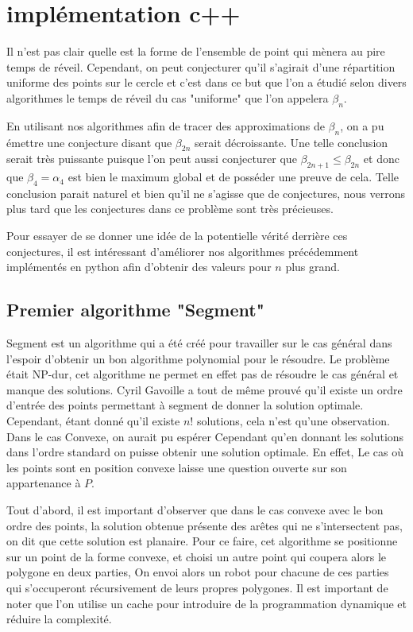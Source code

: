 \section{implémentation c++}

Il n'est pas clair quelle est la forme de l'ensemble de point qui mènera au pire temps de réveil. Cependant, on peut conjecturer qu'il s'agirait d'une répartition uniforme des points sur le cercle et c'est dans ce but que l'on a étudié selon divers algorithmes le temps de réveil du cas "uniforme" que l'on appelera $\beta_n$.

En utilisant nos algorithmes afin de tracer des approximations de $\beta_n$, on a pu émettre une conjecture disant que $\beta_{2n}$ serait décroissante. Une telle conclusion serait très puissante puisque l'on peut aussi conjecturer que $\beta_{2n + 1} \leq \beta_{2n}$ et donc que $\beta_4 = \alpha_4$ est bien le maximum global et de posséder une preuve de cela.
Telle conclusion parait naturel et bien qu'il ne s'agisse que de conjectures, nous verrons plus tard que les conjectures dans ce problème sont très précieuses.

Pour essayer de se donner une idée de la potentielle vérité derrière ces conjectures, il est intéressant d'améliorer nos algorithmes précédemment implémentés en python afin d'obtenir des valeurs pour $n$ plus grand.

\subsection{Premier algorithme "Segment"}

Segment est un algorithme qui a été créé pour travailler sur le cas général dans l'espoir d'obtenir un bon algorithme polynomial pour le résoudre. Le problème était NP-dur, cet algorithme ne permet en effet pas de résoudre le cas général et manque des solutions. Cyril Gavoille a tout de même prouvé qu'il existe un ordre d'entrée des points permettant à segment de donner la solution optimale. Cependant, étant donné qu'il existe $n!$ solutions, cela n'est qu'une observation.
Dans le cas Convexe, on aurait pu espérer Cependant qu'en donnant les solutions dans l'ordre standard on puisse obtenir une solution optimale. En effet, Le cas où les points sont en position convexe laisse une question ouverte sur son appartenance à $P$. 

Tout d'abord, il est important d'observer que dans le cas convexe avec le bon ordre des points, la solution obtenue présente des arêtes qui ne s'intersectent pas, on dit que cette solution est planaire. 
Pour ce faire, cet algorithme se positionne sur un point de la forme convexe, et choisi un autre point qui coupera alors le polygone en deux parties, On envoi alors un robot pour chacune de ces parties qui s'occuperont récursivement de leurs propres polygones.
Il est important de noter que l'on utilise un cache pour introduire de la programmation dynamique et réduire la complexité.


